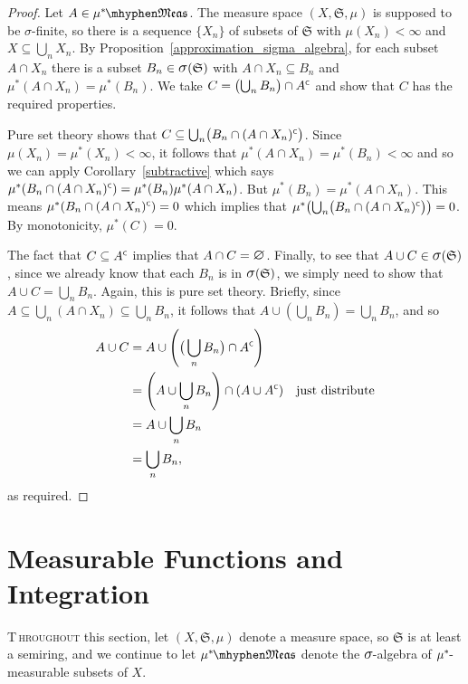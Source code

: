 \documentclass[
twoside=true,
paper=letter,
fontsize=11pt,
pagesize=auto,
leqno,
openany,
headsepline,
overfullrule,
]{scrbook}
\theoremstyle{plain}
\theoremstyle{plain}
\theoremstyle{definition}
\theoremstyle{bfnoteitalic}
\theoremstyle{bfnoteroman}
\newcommand{\sigalg}[1]{\mathfrak{#1}}
\newcommand{\sagb}{\mathop{\hbox{\large{$\sigma$}}}\nolimits}
\newcommand{\textsigma}{\hbox{\large{$\sigma$}}\kern-1pt}
\newcommand{\mtset}{\hbox{\large{$\varnothing$}}}
\newcommand{\comp}{^{\hbox{\tiny{$\mathsf C$}}}}
\newcommand{\meets}{\cap}
\newcommand{\semiring}{\sigalg{S}}
\newcommand{\measurable}[1]{{#1}\mhyphen\mathfrak{Meas}}
\newcommand{\kernast}{\ast\kern-1pt}
\newcommand{\measurespace}{X}
\newcommand{\measure}{\mu}
\begin{document}
\begin{proof}
Let $A\in\measurable{\measure^\kernast}$.
The measure space  $(\measurespace, \semiring, \measure)$ is supposed to be \textsigma-finite, so there is a sequence $\{ \measurespace_n \}$ of subsets of $\semiring$ with  $\measure(\measurespace_n) < \infty$ 
and $\measurespace\subseteq\bigcup_n\measurespace_n$. 
By Proposition~\ref{approximation_sigma_algebra}, for each subset $A\meets \measurespace_n$ there is a subset $B_n\in\sagb(\semiring)$ with $A\meets\measurespace_n\subseteq B_n$ and $\measure^*(A\meets\measurespace_n) = \measure^*(B_n)$. 
We take $C=\bigl( \bigcup_n B_n \bigr) \meets A\comp$ and show that $C$ has the required properties.

Pure set theory shows that 
$C\subseteq \bigcup_n \bigl(B_n \meets (A\meets\measurespace_n)\comp\bigr)$. 
Since $\measure(\measurespace_n) = \measure^*(\measurespace_n)< \infty$, it follows that 
$\measure^*(A\meets\measurespace_n)=\measure^*(B_n) < \infty $ and so we can apply Corollary~\ref{subtractive} which says 
$\measure^*(B_n \meets (A\meets\measurespace_n)\comp)
=\measure^*(B_n)   \measure^*(A\meets\measurespace_n)$. But $\measure^*(B_n) = \measure^*(A\meets\measurespace_n)$. 
This means $\measure^*(B_n \meets (A\meets\measurespace_n)\comp)=0$
which implies that $\measure^*\bigl(\bigcup_n \bigl(B_n \meets (A\meets\measurespace_n)\comp\bigr) \bigr)=0$. By monotonicity, $\measure^*(C)=0$.

The fact that $C\subseteq A\comp$ implies that $A\meets C =\mtset$.
Finally, to see that $A\cup C\in\sagb(\semiring)$, since we already know that each $B_n$ is in $\sagb(\semiring)$, we simply need to show that $A\cup C = \bigcup_n B_n$. Again, this is pure set theory. Briefly, since $A\subseteq \bigcup_n(A\meets \measurespace_n) \subseteq \bigcup_n B_n$, it follows that $A\cup (\bigcup_n B_n) = \bigcup_n B_n$, and so 
\begin{align*}
A\cup C & = A \cup \left( \bigl(\, \bigcup_n B_n \bigr ) \meets A\comp\right)\\
& = \left( A\cup \bigcup_n B_n \right) \meets (A\cup A\comp)
\quad\text{just distribute}\\
& = A \cup \bigcup_n B_n \\
& = \bigcup_n B_n,
\end{align*}
as required.
\end{proof}





\chapter{Measurable Functions and Integration}
\lettrine{T}{\,hroughout} this section, let $(\measurespace, \semiring, \measure)$ denote a measure space, so $\semiring$ is at least a semiring, and we continue to let $\measurable{\measure^\kernast}$ denote the $\textsigma$-algebra of  $\measure^\kernast$-measurable subsets of $\measurespace$. 
\end{document}
